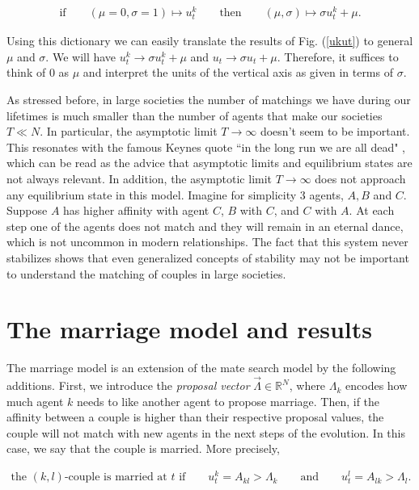 \documentclass[12pt]{article}
\begin{document}
\begin{align}
    \textrm{if}\qquad(\mu=0,\sigma=1)\mapsto u_t^k\qquad\textrm{then}\qquad (\mu,\sigma)\mapsto \sigma u_t^k+\mu.
    \label{generalmusigma}
\end{align}

\noindent Using this dictionary we can easily translate the results of Fig. (\ref{ukut}) to general $\mu$ and $\sigma$. We will have $u_t^k\rightarrow \sigma u_t^k+\mu$ and $u_t\rightarrow \sigma u_t+\mu$. Therefore, it suffices to think of $0$ as $\mu$ and interpret the units of the vertical axis as given in terms of $\sigma$.


As stressed before, in large societies the number of matchings we have during our lifetimes is much smaller than the number of agents that make our societies $T\ll N$. In particular, the asymptotic limit $T\rightarrow\infty$ doesn't seem to be important. This resonates with the famous Keynes quote ``in the long run we are all dead" \cite{keynes1923tract}, which can be read as the advice that asymptotic limits and equilibrium states are not always relevant. In addition, the asymptotic limit $T\rightarrow\infty$ does not approach any equilibrium state in this model. Imagine for simplicity 3 agents, $A,B$ and $C$. Suppose $A$ has higher affinity with agent $C$, $B$ with $C$, and $C$ with $A$. At each step one of the agents does not match and they will remain in an eternal dance, which is not uncommon in modern relationships. The fact that this system never stabilizes shows that even generalized concepts of stability \cite{Multi-period,doval2021dynamically,Credibility,DAMIANO200534} may not be important to understand the matching of couples in large societies.


\section{The marriage model and results}
\label{benefitsofmarriage}

The marriage model is an extension of the mate search model by the following additions. First, we introduce the \textit{proposal vector} $\vec{\Lambda}\in\mathbb{R}^N$, where $\Lambda_k$ encodes how much agent $k$ needs to like another agent to propose marriage. Then, if the affinity between a couple is higher than their respective proposal values, the couple will not match with new agents in the next steps of the evolution. In this case, we say that the couple is married. More precisely, 

\begin{align}
    \textrm{the $(k,l)$-couple is married at $t$ if}\qquad u^k_t=A_{kl}>\Lambda_k\qquad \textrm{and}\qquad u^l_t=A_{lk}>\Lambda_l.
    \label{marriedcoupled}
\end{align}
\end{document}

